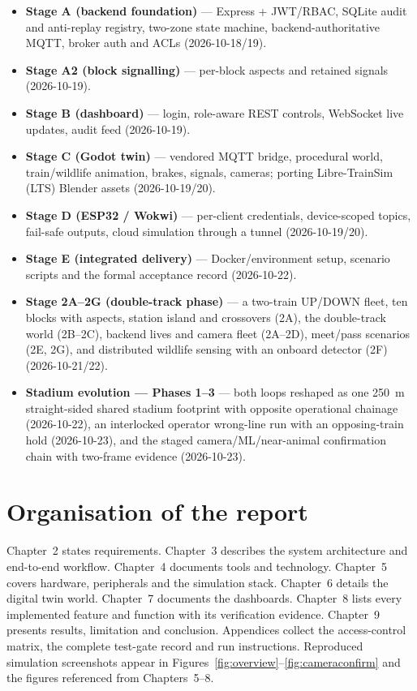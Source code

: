 \begin{itemize}
  \item \textbf{Stage A (backend foundation)} --- Express + JWT/RBAC,
        SQLite audit and anti-replay registry, two-zone state machine,
        backend-authoritative MQTT, broker auth and ACLs
        (2026-10-18/19).
  \item \textbf{Stage A2 (block signalling)} --- per-block aspects and
        retained signals (2026-10-19).
  \item \textbf{Stage B (dashboard)} --- login, role-aware REST controls,
        WebSocket live updates, audit feed (2026-10-19).
  \item \textbf{Stage C (Godot twin)} --- vendored MQTT bridge, procedural
        world, train/wildlife animation, brakes, signals, cameras;
        porting Libre-TrainSim (LTS) Blender assets (2026-10-19/20).
  \item \textbf{Stage D (ESP32 / Wokwi)} --- per-client credentials,
        device-scoped topics, fail-safe outputs, cloud simulation through
        a tunnel (2026-10-19/20).
  \item \textbf{Stage E (integrated delivery)} --- Docker/environment
        setup, scenario scripts and the formal acceptance record
        (2026-10-22).
  \item \textbf{Stage 2A--2G (double-track phase)} --- a two-train UP/DOWN
        fleet, ten blocks with aspects, station island and crossovers
        (2A), the double-track world (2B--2C), backend lives and camera
        fleet (2A--2D), meet/pass scenarios (2E, 2G), and distributed
        wildlife sensing with an onboard detector (2F) (2026-10-21/22).
  \item \textbf{Stadium evolution --- Phases 1--3} --- both loops reshaped
        as one 250~m straight-sided shared stadium footprint with opposite
        operational chainage (2026-10-22), an interlocked operator
        wrong-line run with an opposing-train hold (2026-10-23), and the
        staged camera/ML/near-animal confirmation chain with two-frame
        evidence (2026-10-23).
\end{itemize}

\section{Organisation of the report}

Chapter~2 states requirements. Chapter~3 describes the system architecture
and end-to-end workflow. Chapter~4 documents tools and technology.
Chapter~5 covers hardware, peripherals and the simulation stack.
Chapter~6 details the digital twin world. Chapter~7 documents the
dashboards. Chapter~8 lists every implemented feature and function with
its verification evidence. Chapter~9 presents results, limitation and
conclusion. Appendices collect the access-control matrix, the complete
test-gate record and run instructions. Reproduced simulation screenshots
appear in Figures~\ref{fig:overview}--\ref{fig:cameraconfirm} and the
figures referenced from Chapters~5--8.
